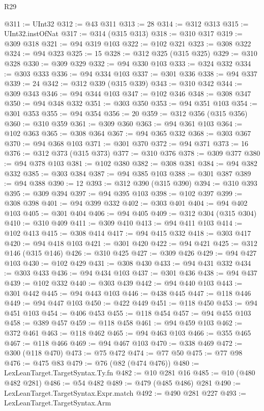 \begin{lexlean}{R29}
\begin{coremodule}
@311 := UInt32
@312 := @43 @311
@313 := 28
@314 := @312 @313
@315 := UInt32.instOfNat
@317 := @314 (@315 @313)
@318 := @310 @317
@319 := @309 @318
@321 := @94 @319 @103
@322 := @102 @321
@323 := @308 @322
@324 := @94 @323
@325 := 15
@328 := @312 @325 (@315 @325)
@329 := @310 @328
@330 := @309 @329
@332 := @94 @330 @103
@333 := @324 @332
@334 := @303 @333
@336 := @94 @334 @103
@337 := @301 @336
@338 := @94 @337
@339 := 24
@342 := @312 @339 (@315 @339)
@343 := @310 @342
@344 := @309 @343
@346 := @94 @344 @103
@347 := @102 @346
@348 := @308 @347
@350 := @94 @348 @332
@351 := @303 @350
@353 := @94 @351 @103
@354 := @301 @353
@355 := @94 @354
@356 := 20
@359 := @312 @356 (@315 @356)
@360 := @310 @359
@361 := @309 @360
@363 := @94 @361 @103
@364 := @102 @363
@365 := @308 @364
@367 := @94 @365 @332
@368 := @303 @367
@370 := @94 @368 @103
@371 := @301 @370
@372 := @94 @371
@373 := 16
@376 := @312 @373 (@315 @373)
@377 := @310 @376
@378 := @309 @377
@380 := @94 @378 @103
@381 := @102 @380
@382 := @308 @381
@384 := @94 @382 @332
@385 := @303 @384
@387 := @94 @385 @103
@388 := @301 @387
@389 := @94 @388
@390 := 12
@393 := @312 @390 (@315 @390)
@394 := @310 @393
@395 := @309 @394
@397 := @94 @395 @103
@398 := @102 @397
@399 := @308 @398
@401 := @94 @399 @332
@402 := @303 @401
@404 := @94 @402 @103
@405 := @301 @404
@406 := @94 @405
@409 := @312 @304 (@315 @304)
@410 := @310 @409
@411 := @309 @410
@413 := @94 @411 @103
@414 := @102 @413
@415 := @308 @414
@417 := @94 @415 @332
@418 := @303 @417
@420 := @94 @418 @103
@421 := @301 @420
@422 := @94 @421
@425 := @312 @146 (@315 @146)
@426 := @310 @425
@427 := @309 @426
@429 := @94 @427 @103
@430 := @102 @429
@431 := @308 @430
@433 := @94 @431 @332
@434 := @303 @433
@436 := @94 @434 @103
@437 := @301 @436
@438 := @94 @437
@439 := @102 @332
@440 := @303 @439
@442 := @94 @440 @103
@443 := @301 @442
@445 := @94 @443 @103
@446 := @438 @445
@447 := @118 @446
@449 := @94 @447 @103
@450 := @422 @449
@451 := @118 @450
@453 := @94 @451 @103
@454 := @406 @453
@455 := @118 @454
@457 := @94 @455 @103
@458 := @389 @457
@459 := @118 @458
@461 := @94 @459 @103
@462 := @372 @461
@463 := @118 @462
@465 := @94 @463 @103
@466 := @355 @465
@467 := @118 @466
@469 := @94 @467 @103
@470 := @338 @469
@472 := @300 (@118 @470)
@473 := @75 @472
@474 := @77 @50
@475 := @77 @98
@476 := @475 @83
@479 := @76 (@82 (@474 @476))
@480 := LexLeanTarget.TargetSyntax.Ty.fn
@482 := @10 @281 @16
@485 := @10 (@480 @482 @281)
@486 := @54 @482
@489 := @479 (@485 @486) @281
@490 := LexLeanTarget.TargetSyntax.Expr.match
@492 := @490 @281 @227
@493 := LexLeanTarget.TargetSyntax.Arm

\end{coremodule}
\end{lexlean}
